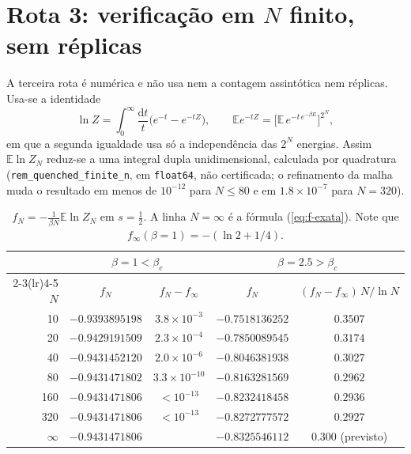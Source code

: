 \documentclass[11pt,a4paper]{article}
\newcommand{\E}{\mathbb{E}}
\newcommand{\dd}{\mathrm{d}}
\begin{document}
\section{Rota 3: verificação em $N$ finito, sem réplicas}
\label{sec:finito}

A terceira rota é numérica e não usa nem a contagem assintótica nem réplicas. Usa-se a identidade
\begin{equation}
  \ln Z=\int_0^\infty\frac{\dd t}{t}\big(e^{-t}-e^{-tZ}\big),
  \qquad
  \E e^{-tZ}=\Big[\E\,e^{-t\,e^{-\beta E}}\Big]^{2^N},
\end{equation}
em que a segunda igualdade usa só a independência das $2^N$ energias. Assim $\E\ln Z_N$ reduz-se a uma
integral dupla unidimensional, calculada por quadratura (\texttt{rem\_quenched\_finite\_n}, em
\texttt{float64}, não certificada; o refinamento da malha muda o resultado em menos de $10^{-12}$ para
$N\le80$ e em $1.8\times10^{-7}$ para $N=320$).

\begin{table}[h]
\centering
\begin{tabular}{rcccc}
\toprule
 & \multicolumn{2}{c}{$\beta=1<\beta_c$} & \multicolumn{2}{c}{$\beta=2.5>\beta_c$} \\
\cmidrule(lr){2-3}\cmidrule(lr){4-5}
$N$ & $f_N$ & $f_N-f_\infty$ & $f_N$ & $(f_N-f_\infty)\,N/\ln N$ \\
\midrule
 10 & $-0.9393895198$ & $3.8\times10^{-3}$ & $-0.7518136252$ & $0.3507$ \\
 20 & $-0.9429191509$ & $2.3\times10^{-4}$ & $-0.7850089545$ & $0.3174$ \\
 40 & $-0.9431452120$ & $2.0\times10^{-6}$ & $-0.8046381938$ & $0.3027$ \\
 80 & $-0.9431471802$ & $3.3\times10^{-10}$& $-0.8163281569$ & $0.2962$ \\
160 & $-0.9431471806$ & $<10^{-13}$        & $-0.8232418458$ & $0.2936$ \\
320 & $-0.9431471806$ & $<10^{-13}$        & $-0.8272777572$ & $0.2927$ \\
\midrule
$\infty$ & $-0.9431471806$ & & $-0.8325546112$ & $0.300$ (previsto) \\
\bottomrule
\end{tabular}
\caption{$f_N=-\frac{1}{\beta N}\E\ln Z_N$ em $s=\tfrac12$. A linha $N=\infty$ é a fórmula
(\ref{eq:f-exata}). Note que $f_\infty(\beta=1)=-(\ln2+1/4)$.}
\label{tab:finito}
\end{table}
\end{document}

